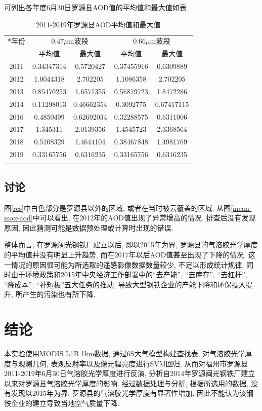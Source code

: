 \documentclass{ctexart}
\begin{document}
\begin{sloppypar}
可列出各年度6月30日罗源县AOD值的平均值和最大值如表
\begin{table}
\begin{center}\caption{2011-2019年罗源县AOD平均值和最大值}\label{table-mean-max}
\begin{tabular}{c|cccc}
\Xhline{1.5pt}
 \multirow{2}*{年份} & \multicolumn{2}{c}{0.47$\mu$m波段} & \multicolumn{2}{c}{0.66$\mu$m波段} \\
 \cmidrule(lr){2-3}\cmidrule(lr){4-5}
 ~ & 平均值 & 最大值 & 平均值 & 最大值 \\
\Xhline{1pt}
 2011 & 0.34347314 & 0.5720427 & 0.37455916 & 0.6309889\\
 2012 & 1.0044318 & 2.702205 & 1.1086358 & 2.702205 \\
 2013 & 0.85470253 & 1.6571355 & 0.56879723 & 1.8472286\\
 2014 & 0.11298013 & 0.46662354 & 0.3092775 & 0.67417115\\
 2016 & 0.4850499 & 0.62692034 & 0.32288575 & 0.6311006\\
 2017 & 1.345311 & 2.0139356 & 1.4545723 & 2.3368564\\
 2018 & 0.5108329 & 1.4644104 & 0.38467848 & 1.4981769\\
 2019 & 0.33165756 & 0.6316235 & 0.33165756 & 0.6316235\\
\Xhline{1.5pt}
\end{tabular}
\end{center}
\end{table}
\subsection{讨论}
图\ref{res}中白色部分是罗源县以外的区域, 或者在当时被云覆盖的区域. 
从图\ref{mean-max-aod}中可以看出, 在2012年的AOD值出现了异常增高的情况.
排查后没有发现原因, 因此猜测可能是数据预处理或计算时出现的错误.

整体而言, 在罗源闽光钢铁厂建立以后, 即以2015年为界, 罗源县的气溶胶光学厚度的平均值并没有明显上升趋势, 而在2017年以后AOD值甚至出现了下降的情况.
这一情况的原因很可能为所选取的遥感影像数据数量较少, 不足以形成统计规律. 同时由于环境政策和2015年中央经济工作部署中的``去产能'', ``去库存'', ``去杠杆'', ``降成本'', ``补短板''五大任务的推动, 导致大型钢铁企业的产能下降和环保投入提升, 所产生的污染也有所下降.

\section{结论}
本实验使用MODIS L1B 1km数据, 通过6S大气模型构建查找表,
对气溶胶光学厚度与观测几何, 表观反射率以及像元辐亮度进行SVM回归, 
从而对福州市罗源县2011-2019年6月30日气溶胶光学厚度进行反演, 分析自2014年罗源闽光钢铁厂建立以来对罗源县气溶胶光学厚度的影响. 
经过数据处理与分析, 根据所选用的数据, 没有发现以2015年为界, 罗源县的气溶胶光学厚度有显著性增加, 因此不能认为该钢铁企业的建立导致当地空气质量下降. 


\end{sloppypar}
\end{document}
